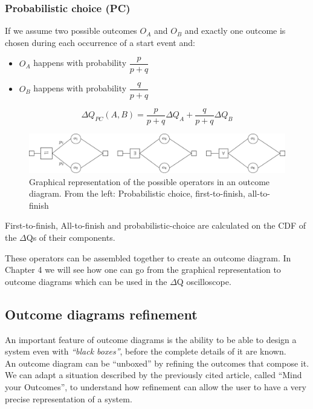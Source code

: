     \subsubsection{Probabilistic choice (PC)}
        If we assume two possible outcomes $O_A$ and $O_B$ and exactly one outcome is chosen during each occurrence of a start event and:
        \begin{itemize}
            \item $O_A$ happens with probability $\dfrac{p}{p+q}$
            \item $O_B$ happens with probability $\dfrac{q}{p + q}$
        \end{itemize}
        \begin{equation}
           \Delta Q_{PC}(A, B) = \dfrac{p}{p + q}\Delta Q_A + \dfrac{q}{p + q}\Delta Q_B 
            \label{eq:pc}
        \end{equation} 

    \begin{figure}[H]
        \begin{center}
            \includegraphics[width = \textwidth]{tikz/op.pdf}
        \end{center}
        \caption{Graphical representation of the possible operators in an outcome diagram. From the left: Probabilistic choice, first-to-finish, all-to-finish \cite{myo}}
        \label{fig:op}
    \end{figure}
    First-to-finish, All-to-finish and probabilistic-choice are calculated on the CDF of the $\Delta$Qs of their components.
    
    These operators can be assembled together to create an outcome diagram. In Chapter 4 we will see how one can go from the graphical representation to outcome diagrams which can be used in the $\Delta$Q oscilloscope.
    
    \subsection{Outcome diagrams refinement}
        An important feature of outcome diagrams is the ability to be able to design a system even with \textit{``black boxes''}, before the complete details of it are known. \cite{myo} \\
        An outcome diagram can be ``unboxed'' by refining the outcomes that compose it. We can adapt a situation described by the previously cited article, called ``Mind your Outcomes'', to understand how refinement can allow the user to have a very precise representation of a system. 
        
